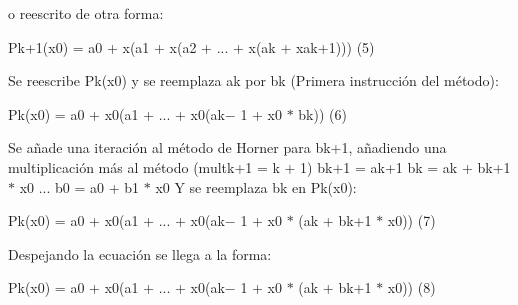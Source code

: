 \documentclass[12pt]{article}
\renewcommand{\_}{\kern-1.5pt\textunderscore\kern-1.5pt}
\begin{document}
\begin{enumerate}
\begin{justify}
{\fontsize{10pt}{12.0pt}\selectfont o reescrito de otra forma: \par}
\end{justify}\par

\begin{Center}
{\fontsize{10pt}{12.0pt}\selectfont Pk+1(x0) = a0 + x(a1 + x(a2 + ... + x(ak + xak+1))) (5) \par}
\end{Center}\par

\begin{justify}
{\fontsize{10pt}{12.0pt}\selectfont Se reescribe Pk(x0) y se reemplaza ak por bk (Primera instrucción del método): \par}
\end{justify}\par

\begin{Center}
{\fontsize{10pt}{12.0pt}\selectfont Pk(x0) = a0 + x0(a1 + ... + x0(ak$-$ 1 + x0 $\ast$  bk)) (6) \par}
\end{Center}\par

\begin{justify}
{\fontsize{10pt}{12.0pt}\selectfont Se añade una iteración al método de Horner para bk+1, añadiendo una multiplicación más al método (multk+1 = k + 1) bk+1 = ak+1 bk = ak + bk+1 $\ast$  x0 ... b0 = a0 + b1 $\ast$  x0 Y se reemplaza bk en Pk(x0):\par}
\end{justify}\par

\begin{Center}
{\fontsize{10pt}{12.0pt}\selectfont  Pk(x0) = a0 + x0(a1 + ... + x0(ak$-$ 1 + x0 $\ast$  (ak + bk+1 $\ast$  x0)) (7) \par}
\end{Center}\par

\begin{justify}
{\fontsize{10pt}{12.0pt}\selectfont Despejando la ecuación se llega a la forma:\par}
\end{justify}\par

\begin{Center}
{\fontsize{10pt}{12.0pt}\selectfont  Pk(x0) = a0 + x0(a1 + ... + x0(ak$-$ 1 + x0 $\ast$  (ak + bk+1 $\ast$  x0)) (8) \par}
\end{Center}\par


\end{enumerate}
\end{document}
